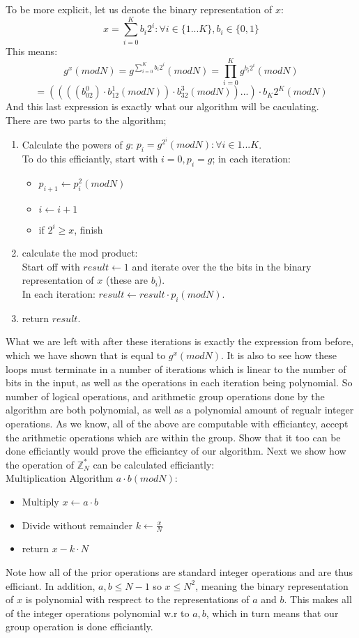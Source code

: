 \documentclass{article}
\begin{document}
To be more explicit, let us denote the binary representation of $x$:
\[x=\sum_{i=0}^Kb_i2^i:\forall i\in\{1...K\}, b_i\in\{0,1\}\]
This means:
\[
	g^x(mod N)=
	g^{\sum_{i=0}^Kb_i2^i}(mod N)=
	\prod_{i=0}^Kg^{b_i2^i}(mod N)
\]
\[
	=(((({b_02^0})\cdot {b_12^1}(mod N))\cdot {b_32^3}(mod N))...)\cdot {b_K2^K}(mod N)
\]
And this last expression is exactly what our algorithm will be caculating.\\
There are two parts to the algorithm;
\begin{enumerate}
	\item Calculate the powers of $g$: $p_i=g^{2^i}(mod N):\forall i\in{1...K}$.\\
	To do this efficiantly, start with $i=0, p_i=g$; in each iteration:
	\begin{itemize}
		\item $p_{i+1}\longleftarrow p_i^2(mod N)$
		\item $i\longleftarrow i+1$
		\item if $2^i\geq x$, finish
	\end{itemize}
	\item calculate the mod product:\\
	Start off with $result\longleftarrow1$ and iterate over the the bits 
	in the binary representation of $x$ (these are $b_i$).\\
	In each iteration: $result\longleftarrow result\cdot p_i(mod N)$.\\
	\item return $result$.\\
\end{enumerate}
What we are left with after these iterations is exactly the expression from before,
which we have shown that is equal to $g^x(mod N)$.
It is also to see how these loops must terminate in a number of iterations which is 
linear to the number of bits in the input, as well as the operations in each iteration
being polynomial. So number of logical operations, and arithmetic group operations done by
the algorithm are both polynomial, as well as a polynomial amount of regualr integer operations.
As we know, all of the above are computable with efficiantcy, accept the arithmetic operations
which are within the group. Show that it too can be done efficiantly would prove the efficiantcy
of our algorithm. Next we show how the operation of $\mathbb{Z}_N^*$ can be 
calculated efficiantly:\\

Multiplication Algorithm $a\cdot b(mod N)$:
\begin{itemize}
	\item Multiply $x\longleftarrow a\cdot b$
	\item Divide without remainder $k\longleftarrow\frac{x}{N}$
	\item return $x-k\cdot N$
\end{itemize}
Note how all of the prior operations are standard integer operations and are thus efficiant.
In addition, $a,b\leq N-1$ so $x\leq N^2$, meaning the binary representation of $x$
is polynomial with resprect to the representations of $a$ and $b$. This makes all of the
integer operations polynomial w.r to $a,b$, which in turn means that our group operation is done
efficiantly.
\end{document}
